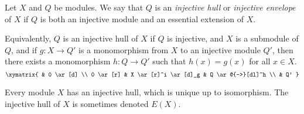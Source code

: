 \documentclass[12pt]{article}
\begin{document}
Let $X$ and $Q$ be modules.
We say that $Q$ is an {\it injective hull} or {\it injective envelope} of $X$
if $Q$ is both an injective module and an essential extension of $X$.

Equivalently, $Q$ is an injective hull of $X$
if $Q$ is injective,
and $X$ is a submodule of $Q$,
and if $g : X \to Q'$ is a monomorphism
from $X$ to an injective module $Q'$,
then there exists a monomorphism $h : Q \to Q'$
such that $h(x) = g(x)$ for all $x \in X$.
$$
\xymatrix{
  &
  0
        \ar[d]
  \\
  0
        \ar[r]
  &
  X
        \ar[r]^i
        \ar[d]_g
  &
  Q
        \ar@{-->}[dl]^h
  \\
  &
  Q'
}
$$

Every module $X$ has an injective hull, which is unique up to isomorphism.  The injective hull of $X$ is sometimes denoted $E(X)$.
\end{document}
